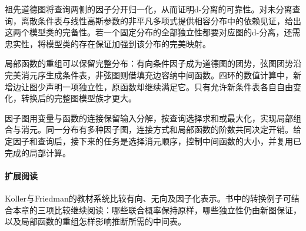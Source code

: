 祖先道德图将查询两侧的因子分开归一化，从而证明d-分离的可靠性。对未分离查询，离散条件表与线性高斯参数的非平凡多项式提供相容分布中的依赖见证，给出这两个模型类的完备性。若一个固定分布的全部独立性都要对应图的d-分离，还需忠实性，将模型类的存在保证加强到该分布的完美映射。

局部函数的重组可以保留完整分布：有向条件因子成为道德图的团势，弦图团势沿完美消元序生成条件表，非弦图则借填充边容纳中间函数。四环的数值计算中，新增边让图少声明一项独立性，原函数却继续满足它。只有允许新条件表各自自由变化，转换后的完整图模型族才更大。

因子图用变量与函数的连接保留输入分解，按查询选择求和或最大化，实现局部组合与消元。同一分布有多种因子图，连接方式和局部函数的阶数共同决定开销。给定因子和查询后，接下来的任务是选择消元顺序，控制中间函数的大小，并复用已完成的局部计算。

\paragraph{扩展阅读}
Koller与Friedman的教材系统比较有向、无向及因子化表示。书中的转换例子可结合本章的三项比较继续阅读：哪些联合概率保持原样，哪些独立性仍由新图保证，以及局部函数的重组怎样影响推断所需的中间表。
